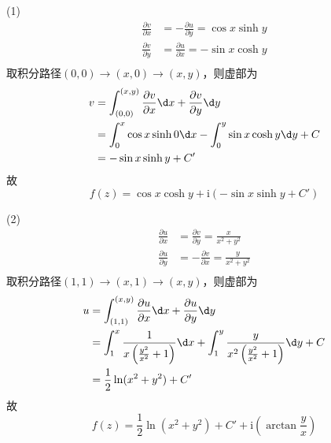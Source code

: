 \documentclass{phyasgn}
\renewcommand{\i}{\mathrm{i}}
\begin{document}
\begin{sol}[2]
    (1)$$\begin{aligned}
        \frac{\partial v}{\partial x}&=-\frac{\partial u}{\partial y}=\cos x\sinh y\\
        \frac{\partial v}{\partial y}&=\frac{\partial u}{\partial x}=-\sin x\cosh y\\
    \end{aligned}$$
    取积分路径$(0,0)\to(x,0)\to(x,y)$，则虚部为
    $$\begin{aligned}
        v&=\int_{(0,0)}^{(x,y)}\frac{\partial v}{\partial x}\d x+\frac{\partial v}{\partial y}\d y\\
        &=\int_0^x\cos x\sinh 0\d x-\int_0^y\sin x\cosh y\d y+C\\
        &=-\sin x\sinh y+C'
    \end{aligned}$$
    故
    $$f(z)=\cos x\cosh y+\i (-\sin x\sinh y+C')$$\par
    (2)$$\begin{aligned}
        \frac{\partial u}{\partial x}&=\frac{\partial v}{\partial y}=\frac{x}{x^2+y^2}\\
        \frac{\partial u}{\partial y}&=-\frac{\partial v}{\partial x}=\frac{y}{x^2+y^2}\\
    \end{aligned}$$
    取积分路径$(1,1)\to(x,1)\to(x,y)$，则虚部为
    $$\begin{aligned}
        u&=\int_{(1,1)}^{(x,y)}\frac{\partial u}{\partial x}\d x+\frac{\partial u}{\partial y}\d y\\
        &=\int_1^x\frac{1}{x \left(\frac{y^2}{x^2}+1\right)}\d x+\int_1^y\frac{y}{x^2 \left(\frac{y^2}{x^2}+1\right)}\d y+C\\
        &=\frac{1}{2}\ln(x^2+y^2)+C'
    \end{aligned}$$
    故
    $$f(z)=\frac{1}{2}\ln(x^2+y^2)+C'+\i (\arctan\frac{y}{x})$$
 \end{sol}\par
\end{document}
